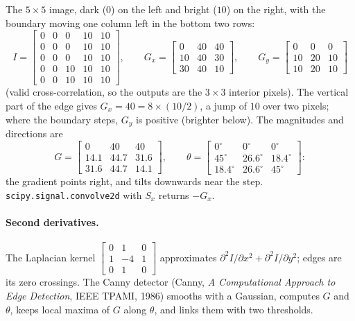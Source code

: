 \begin{notechapter}
\begin{example}\label{convolution-filtering:ex:sobel}
The $5\times5$ image, dark ($0$) on the left and bright ($10$) on the right, with the boundary
moving one column left in the bottom two rows:
\[
  I = \begin{bmatrix}0&0&0&10&10\\0&0&0&10&10\\0&0&0&10&10\\0&0&10&10&10\\0&0&10&10&10\end{bmatrix},\qquad
  G_x = \begin{bmatrix}0&40&40\\10&40&30\\30&40&10\end{bmatrix},\qquad
  G_y = \begin{bmatrix}0&0&0\\10&20&10\\10&20&10\end{bmatrix}
\]
(valid cross-correlation, so the outputs are the $3\times3$ interior pixels). The vertical part
of the edge gives $G_x = 40 = 8\times(10/2)$, a jump of $10$ over two pixels; where the boundary steps, $G_y$
is positive (brighter below). The magnitudes and directions are
\[
  G = \begin{bmatrix}0&40&40\\14.1&44.7&31.6\\31.6&44.7&14.1\end{bmatrix},\qquad
  \theta = \begin{bmatrix}0^\circ&0^\circ&0^\circ\\45^\circ&26.6^\circ&18.4^\circ\\18.4^\circ&26.6^\circ&45^\circ\end{bmatrix}:
\]
the gradient points right, and tilts downwards near the step. \texttt{scipy.signal.convolve2d}
with $S_x$ returns $-G_x$.
\end{example}

\paragraph{Second derivatives.} The Laplacian kernel $\begin{bmatrix}0&1&0\\1&-4&1\\0&1&0\end{bmatrix}$ approximates
$\partial^2I/\partial x^2 + \partial^2I/\partial y^2$; edges are its zero crossings. The Canny detector (Canny, \emph{A
Computational Approach to Edge Detection}, IEEE TPAMI, 1986) smooths with a Gaussian,
computes $G$ and $\theta$, keeps local maxima of $G$ along $\theta$, and links them with two thresholds.


\end{notechapter}
